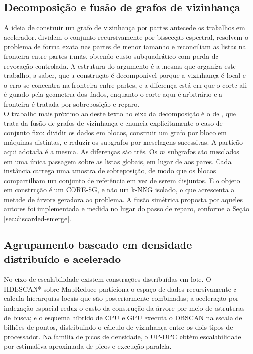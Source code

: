 \subsection{Decomposição e fusão de grafos de vizinhança\label{sec:rel-merge}}

A ideia de construir um grafo de vizinhança por partes antecede os trabalhos em acelerador.  dividem o conjunto recursivamente por bissecção espectral, resolvem o problema de forma exata nas partes de menor tamanho e reconciliam as listas na fronteira entre partes irmãs, obtendo custo subquadrático com perda de revocação controlada. A estrutura do argumento é a mesma que organiza este trabalho, a saber, que a construção é decomponível porque a vizinhança é local e o erro se concentra na fronteira entre partes, e a diferença está em que o corte ali é guiado pela geometria dos dados, enquanto o corte aqui é arbitrário e a fronteira é tratada por sobreposição e reparo.\\

O trabalho mais próximo ao deste texto no eixo da decomposição é o de , que trata da fusão de grafos de vizinhança e enuncia explicitamente o caso de conjunto fixo: dividir os dados em blocos, construir um grafo por bloco em máquinas distintas, e reduzir os subgrafos por mesclagens sucessivas. A partição aqui adotada é a mesma. As diferenças são três. Os $m$ subgrafos são mesclados em uma única passagem sobre as listas globais, em lugar de aos pares. Cada instância carrega uma amostra de sobreposição, de modo que os blocos compartilham um conjunto de referência em vez de serem disjuntos. E o objeto em construção é um \ac{CORE-SG}, e não um \ac{k-NNG} isolado, o que acrescenta a metade de árvore geradora ao problema. A fusão simétrica proposta por aqueles autores foi implementada e medida no lugar do passo de reparo, conforme a Seção \ref{sec:discarded-smerge}.\\

\subsection{Agrupamento baseado em densidade distribuído e acelerado\label{sec:rel-distributed}}

No eixo de escalabilidade existem construções distribuídas em lote. O \ac{HDBSCAN*} sobre MapReduce \cite{mrhdbscan} particiona o espaço de dados recursivamente e calcula hierarquias locais que são posteriormente combinadas; a aceleração por indexação espacial \cite{acceleratedhdbscan} reduz o custo da construção da árvore por meio de estruturas de busca; e o esquema híbrido de \ac{CPU} e \ac{GPU} \cite{bpshdbscan} executa o \ac{DBSCAN} na escala de bilhões de pontos, distribuindo o cálculo de vizinhança entre os dois tipos de processador. Na família de picos de densidade, o UP-DPC \cite{up-dpc} obtém escalabilidade por estimativa aproximada de picos e execução paralela.\\

